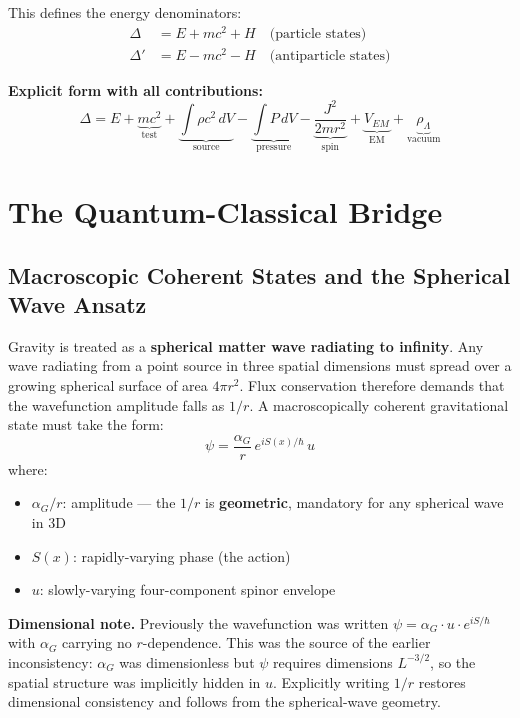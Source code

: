 \documentclass[11pt,a4paper]{article}
\theoremstyle{definition}
\theoremstyle{remark}
\begin{document}
	This defines the energy denominators:
	\begin{align}
		\Delta  &= E + mc^2 + H \quad\text{(particle states)}    \label{eq:Delta}\\
		\Delta' &= E - mc^2 - H \quad\text{(antiparticle states)} \label{eq:Delta_prime}
	\end{align}
	
	\textbf{Explicit form with all contributions:}
	\begin{equation}
		\boxed{
			\Delta = E + \underbrace{mc^2}_{\text{test}} + \underbrace{\int\rho c^2\,dV}_{\text{source}} - \underbrace{\int P\,dV}_{\text{pressure}} - \underbrace{\frac{J^2}{2mr^2}}_{\text{spin}} + \underbrace{V_{EM}}_{\text{EM}} + \underbrace{\rho_\Lambda}_{\text{vacuum}}
		}
		\label{eq:Delta_full}
	\end{equation}
	
	\section{The Quantum-Classical Bridge}
	
	\subsection{Macroscopic Coherent States and the Spherical Wave Ansatz}
	
	Gravity is treated as a \textbf{spherical matter wave radiating to infinity}.  Any wave radiating from a point source in three spatial dimensions must spread over a growing spherical surface of area $4\pi r^2$.  Flux conservation therefore demands that the wavefunction amplitude falls as $1/r$.  A macroscopically coherent gravitational state must take the form:
	\begin{equation}
		\psi = \frac{\alpha_G}{r}\,e^{iS(x)/\hbar}\,u
		\label{eq:coherent_state}
	\end{equation}
	where:
	\begin{itemize}
		\item $\alpha_G/r$: amplitude --- the $1/r$ is \textbf{geometric}, mandatory for any spherical wave in 3D
		\item $S(x)$: rapidly-varying phase (the action)
		\item $u$: slowly-varying four-component spinor envelope
	\end{itemize}
	
	\textbf{Dimensional note.}  Previously the wavefunction was written $\psi = \alpha_G \cdot u \cdot e^{iS/\hbar}$ with $\alpha_G$ carrying no $r$-dependence.  This was the source of the earlier inconsistency: $\alpha_G$ was dimensionless but $\psi$ requires dimensions $L^{-3/2}$, so the spatial structure was implicitly hidden in $u$.  Explicitly writing $1/r$ restores dimensional consistency and follows from the spherical-wave geometry.
	
\end{document}
